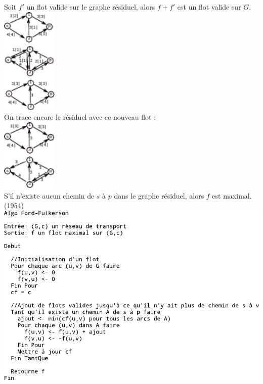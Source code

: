  Soit $f'$ un flot valide sur le graphe résiduel, alors $f+f'$ est un flot valide sur $G$.\\
\includegraphics[width=100px]{Images/fig37.pdf}\\
On trace encore le résiduel avec ce nouveau flot : \\
\includegraphics[width=100px]{Images/fig38.pdf}\\

 S'il n'existe aucun chemin de $s$ à $p$ dans le graphe résiduel, alors $f$ est maximal. \\

 (1954) \\
\includegraphics{Images/fig39.pdf}
